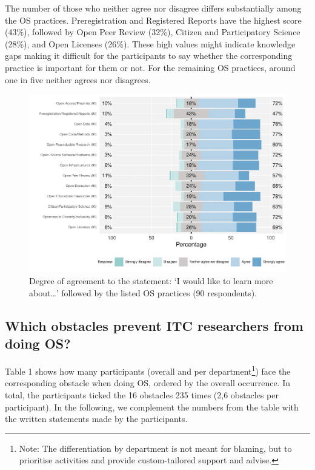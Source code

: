 \documentclass[gc, manuscript]{copernicus}
\begin{document}
The number of those who neither agree nor disagree differs substantially
among the OS practices. Preregistration and Registered Reports have the
highest score (43\%), followed by Open Peer Review (32\%), Citizen and
Participatory Science (28\%), and Open Licenses (26\%). These high
values might indicate knowledge gaps making it difficult for the
participants to say whether the corresponding practice is important for
them or not. For the remaining OS practices, around one in five neither
agrees nor disagrees.

\begin{figure}
\centering
\includegraphics{report_files/figure-latex/unnamed-chunk-5-1.pdf}
\caption{Degree of agreement to the statement: `I would like to learn
more about\ldots{}' followed by the listed OS practices (90
respondents).}
\end{figure}

\subsection{Which obstacles prevent ITC researchers from doing OS?}

Table 1 shows how many participants (overall and per
department\footnote{Note: The differentiation by department is not meant
  for blaming, but to prioritise activities and provide custom-tailored
  support and advise.}) face the corresponding obstacle when doing OS,
ordered by the overall occurrence. In total, the participants ticked the
16 obstacles 235 times (2,6 obstacles per participant). In the
following, we complement the numbers from the table with the written
statements made by the participants.
\end{document}
